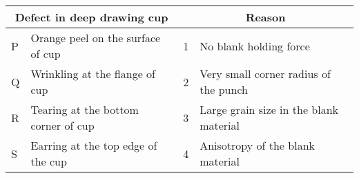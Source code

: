 \begin{center}
\begin{tabular}{|p{1cm}|p{5cm}|p{1cm}|p{6cm}|}
\hline
\multicolumn{2}{|c|}{Defect in deep drawing cup} & \multicolumn{2}{c|}{Reason} \\
\hline
P & Orange peel on the surface of cup & 1 & No blank holding force \\
\hline
Q & Wrinkling at the flange of cup & 2 & Very small corner radius of the punch \\
\hline
R & Tearing at the bottom corner of cup & 3 & Large grain size in the blank material \\
\hline
S & Earring at the top edge of the cup & 4 & Anisotropy of the blank material \\
\hline
\end{tabular}
\end{center}

